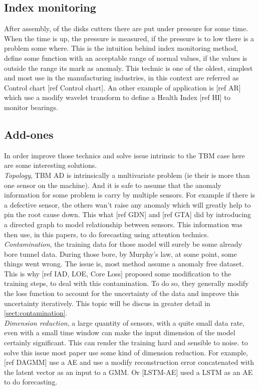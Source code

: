 \documentclass[../../main/main.tex]{subfiles}
\begin{document}
    \subsection{Index monitoring}
        After assembly, of the disks cutters there are put under pressure for some time. When the time is up, the 
        pressure is measured, if the pressure is to low there is a problem some where. This is the intuition behind index 
        monitoring method, define some function with an acceptable range of normal values, if the values is outside the range 
        its mark as anomaly. This technic is one of the oldest, simplest and most use in the manufacturing industries, in
        this context are referred as Control chart [ref Control chart]. An other example of application is [ref AR] which 
        use a modify wavelet transform to define a Health Index [ref HI] to monitor bearings. 

    \subsection{Add-ones}
        In order improve those technics and solve issue intrinsic to the TBM case here are some interesting solutions.\\
        \textit{Topology}, TBM AD is intrinsically a multivariate problem (ie their is more than one sensor on the machine).
        And it is safe to assume that the anomaly information for some problem is carry by multiple sensors. For example if there 
        is a defective sensor, the others wan't raise any anomaly which will greatly help to pin the root cause down. This what 
        [ref GDN] and [ref GTA] did by introducing a directed graph to model relationship between sensors. This information 
        was then use, in this papers, to do forecasting using attention technics.\\
        
        \textit{Contamination}, the training data for those model will surely be some already bore tunnel data. 
        During those bore, by Murphy's law, at some point, some things went wrong. The issue is, most method assume a anomaly
        free dataset. This is why [ref IAD, LOE, Core Loss] proposed some modification to the training steps, to deal with this 
        contamination. To do so, they generally modify the loss function to account for the uncertainty of the data and improve 
        this uncertainty iteratively. This topic will be discus in greater detail in \ref{sect:contamination}.\\

        \textit{Dimension reduction}, a large quantity of sensors, with a quite small data rate, even with a small time window
        can make the input dimension of the model certainly significant. This can render the training hard and sensible to noise. 
        to solve this issue most paper use some kind of dimension reduction. For example, [ref DAGMM] use a AE and use
        a modify reconstruction error concatenated with the latent vector as an input to a GMM. Or [LSTM-AE] used a LSTM as
        an AE to do forecasting.


        
    
\end{document}
